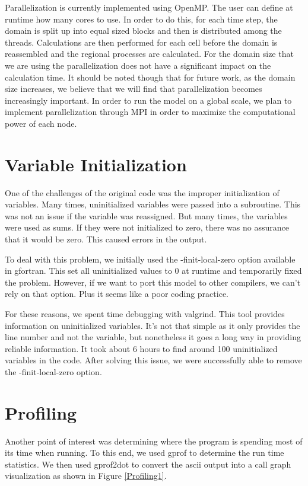 \documentclass[pdftex,12pt,a4paper]{article}
\begin{document}
Parallelization is currently implemented using OpenMP. The user can define at runtime how many cores to use. In order to do this, for each time step, the domain is split up into equal sized blocks and then is distributed among the threads. Calculations are then performed for each cell before the domain is reassembled and the regional processes are calculated. For the domain size that we are using the parallelization does not have a significant impact on the calculation time. It should be noted though that for future work, as the domain size increases, we believe that we will find that parallelization becomes increasingly important. In order to run the model on a global scale, we plan to implement parallelization through MPI in order to maximize the computational power of each node.

\section{Variable Initialization}
One of the challenges of the original code was the improper initialization of variables. Many times, uninitialized variables were passed into a subroutine. This was not an issue if the variable was reassigned. But many times, the variables were used as sums. If they were not initialized to zero, there was no assurance that it would be zero. This caused errors in the output. 

To deal with this problem, we initially used the -finit-local-zero option available in gfortran. This set all uninitialized values to 0 at runtime and temporarily fixed the problem. However, if we want to port this model to other compilers, we can't rely on that option. Plus it seems like a poor coding practice. 

For these reasons, we spent time debugging with valgrind. This tool provides information on uninitialized variables. It's not that simple as it only provides the line number and not the variable, but nonetheless it goes a long way in providing reliable information. It took about 6 hours to find around 100 uninitialized variables in the code. After solving this issue, we were successfully able to remove the -finit-local-zero option.

\section{Profiling}

Another point of interest was determining where the program is spending most of its time when running. To this end, we used gprof to determine the run time statistics. We then used gprof2dot to convert the ascii output into a call graph visualization as shown in Figure \ref{Profiling1}. 
\end{document}
